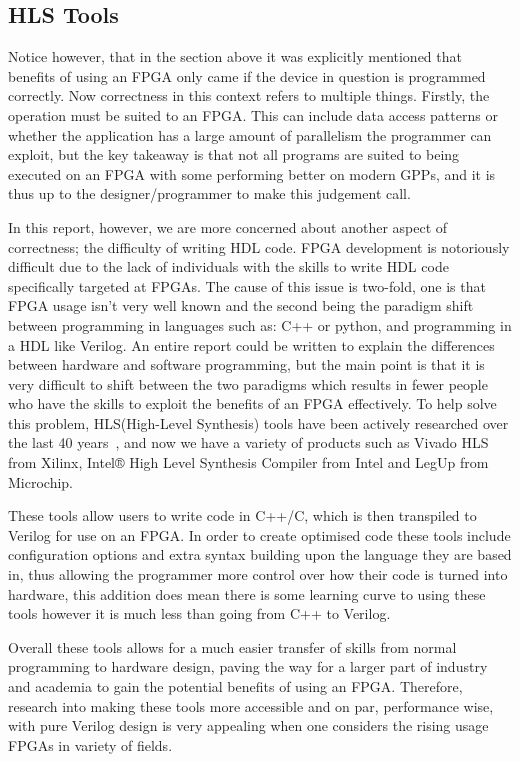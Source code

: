 \subsection{HLS Tools}

Notice however, that in the section above it was explicitly mentioned that benefits of using an FPGA only came if the device in question is programmed correctly. Now correctness in this context refers to multiple things. Firstly, the operation must be suited to an FPGA. This can include data access patterns or whether the application has a large amount of parallelism the programmer can exploit, but the key takeaway is that not all programs are suited to being executed on an FPGA with some performing better on modern GPPs, and it is thus up to the designer/programmer to make this judgement call.

In this report, however, we are more concerned about another aspect of correctness; the difficulty of writing HDL code. FPGA development is notoriously difficult due to the lack of individuals with the skills to write HDL code specifically targeted at FPGAs. The cause of this issue is two-fold, one is that FPGA usage isn't very well known and the second being the paradigm shift between programming in languages such as: C++ or python, and programming in a HDL like Verilog. An entire report could be written to explain the differences between hardware and software programming, but the main point is that it is very difficult to shift between the two paradigms which results in fewer people who have the skills to exploit the benefits of an FPGA effectively. To help solve this problem, HLS(High-Level Synthesis) tools have been actively researched over the last 40 years~\cite{5209959}, and now we have a variety of products such as Vivado HLS from Xilinx, Intel® High Level Synthesis Compiler from Intel and LegUp from Microchip.

These tools allow users to write code in C++/C, which is then transpiled to Verilog for use on an FPGA. In order to create optimised code these tools include configuration options and extra syntax building upon the language they are based in, thus allowing the programmer more control over how their code is turned into hardware, this addition does mean there is some learning curve to using these tools however it is much less than going from C++ to Verilog. 

Overall these tools allows for a much easier transfer of skills from normal programming to hardware design, paving the way for a larger part of industry and academia to gain the potential benefits of using an FPGA. Therefore, research into making these tools more accessible and on par, performance wise, with pure Verilog design is very appealing when one considers the rising usage FPGAs in variety of fields\cite{fpga-market}.


